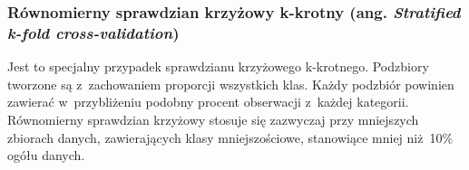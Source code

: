 \subsubsection{Równomierny sprawdzian krzyżowy k-krotny (ang. \textit{Stratified k-fold cross-validation})}
Jest to specjalny przypadek sprawdzianu krzyżowego k-krotnego. Podzbiory tworzone są z~zachowaniem proporcji wszystkich klas. Każdy podzbiór powinien zawierać w~przybliżeniu podobny procent obserwacji z~każdej kategorii. Równomierny sprawdzian krzyżowy stosuje się zazwyczaj przy mniejszych zbiorach danych, zawierających klasy mniejszościowe, stanowiące mniej niż 10\% ogółu danych.








